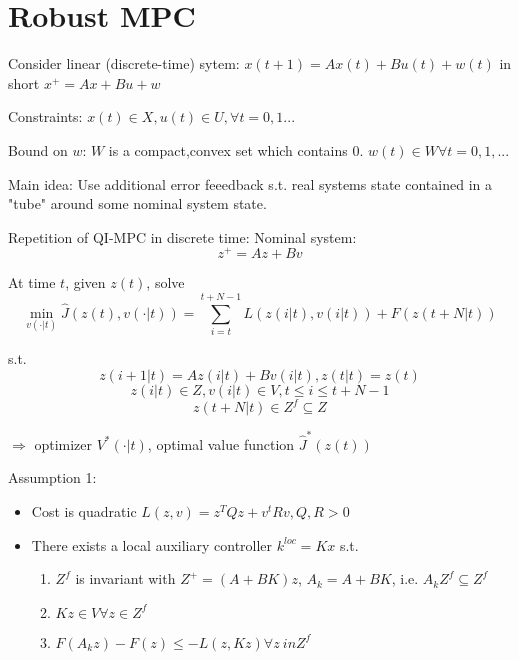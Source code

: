 \chapter{Robust MPC}

Consider linear (discrete-time) sytem:
$x(t+1) = Ax(t) + Bu(t) + w(t)$
in short $x^+=Ax+Bu+w$

Constraints: $x(t) \in X, u(t) \in U, \forall t = 0,1...$

Bound on $w$:
$W$ is a compact,convex set which contains $0$. $w(t) \in W \forall t =0,1,...$

Main idea:
Use additional error feeedback s.t. real systems state contained in a "tube" around some nominal system state.

Repetition of QI-MPC in discrete time:
Nominal system:
\begin{equation*}
z^+ = Az+Bv
\end{equation*}

At time $t$, given $z(t)$, solve 
\begin{equation*}
\min_{v(\cdot | t)} \hat J(z(t),v(\cdot|t)) = \sum_{i=t}^{t+N-1}L(z(i|t),v(i|t)) + F(z(t+N|t))
\end{equation*} 

s.t. 
\begin{equation*}
z(i+1|t) = Az(i|t)+Bv(i|t), z(t|t) = z(t)
\end{equation*}
\begin{equation*}
z(i|t) \in Z, v(i|t) \in V, t \leq i \leq t+N-1
\end{equation*}
\begin{equation*}
z(t+N|t) \in Z^f \subseteq Z
\end{equation*}

$\Rightarrow$ optimizer $V^*(\cdot|t)$, optimal value function $\hat J^*(z(t))$

Assumption 1:
\begin{itemize}
\item Cost is quadratic $L(z,v) = z^TQz + v^tRv, Q,R > 0$
\item There exists a local auxiliary controller $k^{loc} = Kx$ s.t.
\begin{enumerate}
\item $Z^f$ is invariant with $Z^+=(A+BK)z$, $A_k = A+BK$, i.e. $A_kZ^f \subseteq Z^f$
\item $Kz \in V \forall z \in Z^f$
\item $F(A_kz)-F(z) \leq - L(z,Kz) \forall z \ in Z^f$
\end{enumerate}
\end{itemize}

